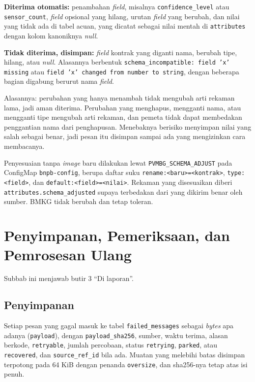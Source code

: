 \textbf{Diterima otomatis:} penambahan \textit{field}, misalnya \texttt{confidence\_level} atau \texttt{sensor\_count}, \textit{field} opsional yang hilang, urutan \textit{field} yang berubah, dan nilai yang tidak ada di tabel acuan, yang dicatat sebagai nilai mentah di \texttt{attributes} dengan kolom kanoniknya \textit{null}.

\textbf{Tidak diterima, disimpan:} \textit{field} kontrak yang diganti nama, berubah tipe, hilang, atau \textit{null}. Alasannya berbentuk \texttt{schema\_incompatible: field 'x' missing} atau \texttt{field 'x' changed from number to string}, dengan beberapa bagian digabung berurut nama \textit{field}.

Alasannya: perubahan yang hanya menambah tidak mengubah arti rekaman lama, jadi aman diterima. Perubahan yang menghapus, mengganti nama, atau mengganti tipe mengubah arti rekaman, dan pemeta tidak dapat membedakan penggantian nama dari penghapusan. Menebaknya berisiko menyimpan nilai yang salah sebagai benar, jadi pesan itu disimpan sampai ada yang mengizinkan cara membacanya.

Penyesuaian tanpa \textit{image} baru dilakukan lewat \texttt{PVMBG\_SCHEMA\_ADJUST} pada ConfigMap \texttt{bnpb-config}, berupa daftar suku \texttt{rename:<baru>=<kontrak>}, \texttt{type:<field>}, dan \texttt{default:<field>=<nilai>}. Rekaman yang disesuaikan diberi \texttt{attributes.schema\_adjusted} supaya terbedakan dari yang dikirim benar oleh sumber. BMKG tidak berubah dan tetap toleran.

\section{Penyimpanan, Pemeriksaan, dan Pemrosesan Ulang}

Subbab ini menjawab butir 3 ``Di laporan''.

\subsection{Penyimpanan}

Setiap pesan yang gagal masuk ke tabel \texttt{failed\_messages} sebagai \textit{bytes} apa adanya (\texttt{payload}), dengan \texttt{payload\_sha256}, sumber, waktu terima, alasan berkode, \texttt{retryable}, jumlah percobaan, status \texttt{retrying}, \texttt{parked}, atau \texttt{recovered}, dan \texttt{source\_ref\_id} bila ada. Muatan yang melebihi batas disimpan terpotong pada 64 KiB dengan penanda \texttt{oversize}, dan sha256-nya tetap atas isi penuh.

